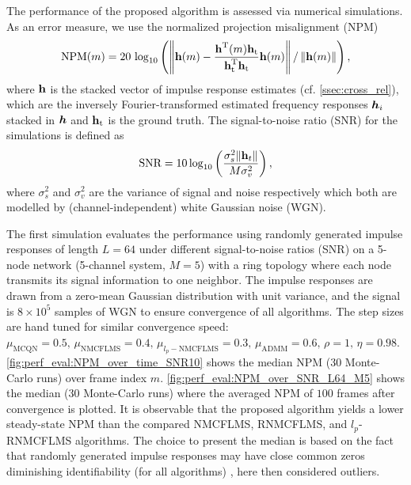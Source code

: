 \documentclass{article}
\begin{document}
The performance of the proposed algorithm is assessed via numerical simulations.
As an error measure, we use the normalized projection misalignment (NPM) \cite{huangClassFrequencydomainAdaptive2003}
\begin{equation}
    \text{NPM}(m) = 20\,\log_{10} \left(\left\| \bm{\mathrm{h}}(m) - \frac{\bm{\mathrm{h}}^{\mathrm{T}} (m) \bm{\mathrm{h}}_{\text{t}}}{\bm{\mathrm{h}}_{\text{t}}^{\mathrm{T}} \bm{\mathrm{h}}_{\text{t}}}\bm{\mathrm{h}}(m) \right\| / \left\|\bm{\mathrm{h}}(m)\right\| \right),
\end{equation}
where \(\bm{\mathrm{h}}\) is the stacked vector of impulse response estimates (cf. \autoref{ssec:cross_rel}), which are the inversely Fourier-transformed estimated frequency responses \({\bm{h}}_i\) stacked in \({\bm{h}}\) and \(\bm{\mathrm{h}}_{\text{t}}\) is the ground truth. The signal-to-noise ratio (SNR) for the simulations is defined as 
\begin{equation}
    \text{SNR} = 10 \log_{10} \left(\frac{\sigma_s^2 \| \bm{\mathrm{h}}_t \|}{M \sigma_v^2} \right),
\end{equation}
where \(\sigma_s^2\) and \(\sigma_v^2\) are the variance of signal and noise respectively which both are modelled by (channel-independent) white Gaussian noise (WGN).

The first simulation evaluates the performance using randomly generated impulse responses of length \(L=64\) under different signal-to-noise ratios (SNR) on a 5-node network (5-channel system, \(M=5\)) with a ring topology where each node transmits its signal information to one neighbor.
The impulse responses are drawn from a zero-mean Gaussian distribution with unit variance, and the signal is \(8 \times 10^{5}\) samples of WGN to ensure convergence of all algorithms.
The step sizes are hand tuned for similar convergence speed: \(\mu_{\text{MCQN}}=0.5,\, \mu_{\text{NMCFLMS}}=0.4,\, \mu_{l_p-\text{NMCFLMS}}=0.3,\, \mu_{\text{ADMM}}=0.6,\, \rho=1,\,\eta=0.98 \).
\autoref{fig:perf_eval:NPM_over_time_SNR10} shows the median NPM (30 Monte-Carlo runs) over frame index \(m\).
\autoref{fig:perf_eval:NPM_over_SNR_L64_M5} shows the median (30 Monte-Carlo runs) where the averaged NPM of \(100\) frames after convergence is plotted.
It is observable that the proposed algorithm yields a lower steady-state NPM than the compared NMCFLMS, RNMCFLMS, and \(l_p\)-RNMCFLMS algorithms.
The choice to present the median is based on the fact that randomly generated impulse responses may have close common zeros diminishing identifiability (for all algorithms) \cite{naylorNearCommonZerosBlind2008}, here then considered outliers.
\end{document}
